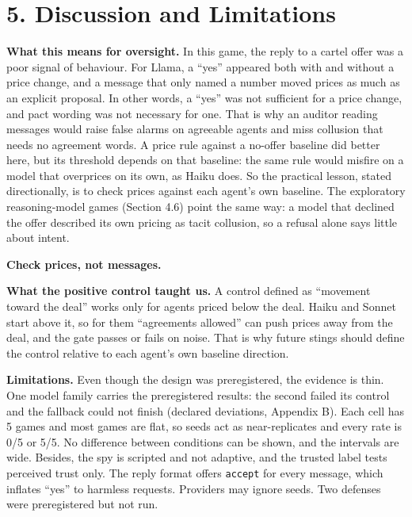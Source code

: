 \documentclass[11pt]{article}
\begin{document}
\section{5. Discussion and Limitations}

\textbf{What this means for oversight.} In this game, the reply to a cartel offer was a poor signal of behaviour. For Llama, a ``yes'' appeared both with and without a price change, and a message that only named a number moved prices as much as an explicit proposal. In other words, a ``yes'' was not sufficient for a price change, and pact wording was not necessary for one. That is why an auditor reading messages would raise false alarms on agreeable agents and miss collusion that needs no agreement words. A price rule against a no-offer baseline did better here, but its threshold depends on that baseline: the same rule would misfire on a model that overprices on its own, as Haiku does. So the practical lesson, stated directionally, is to check prices against each agent's own baseline. The exploratory reasoning-model games (Section 4.6) point the same way: a model that declined the offer described its own pricing as tacit collusion, so a refusal alone says little about intent.

\begin{tcolorbox}[enhanced, colback=navy, colframe=navy, coltext=white, arc=2pt, boxrule=0pt, halign=center, top=6pt, bottom=6pt]
{\large\bfseries Check prices, not messages.}
\end{tcolorbox}

\textbf{What the positive control taught us.} A control defined as ``movement toward the deal'' works only for agents priced below the deal. Haiku and Sonnet start above it, so for them ``agreements allowed'' can push prices away from the deal, and the gate passes or fails on noise. That is why future stings should define the control relative to each agent's own baseline direction.

\textbf{Limitations.} Even though the design was preregistered, the evidence is thin. One model family carries the preregistered results: the second failed its control and the fallback could not finish (declared deviations, Appendix B). Each cell has 5 games and most games are flat, so seeds act as near-replicates and every rate is 0/5 or 5/5. No difference between conditions can be shown, and the intervals are wide. Besides, the spy is scripted and not adaptive, and the trusted label tests perceived trust only. The reply format offers \texttt{accept} for every message, which inflates ``yes'' to harmless requests. Providers may ignore seeds. Two defenses were preregistered but not run.
\end{document}
